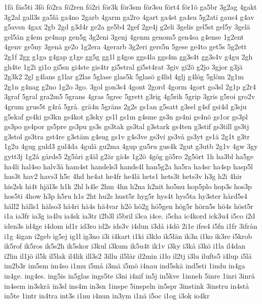 {{1f^^e4
f^^e4s5ti
3f^^f6
f^^f62ra
f^^f62ren
f^^f62ri
f^^f6r3k
f^^f6r3sm
f^^f6r3su
f^^f6rt4
f^^f6r1^^f6
ga5br
3g2ag
4gakt
3g2al
gall3s
ga5l^^e4
ga4no
2garb
4garm
ga2ro
4gart
ga4st
ga4su
5g2ati
gaus4
g4av
g5avsn
4gax
2gb
2gd
g3d4r
ge2a
ge5b4
2gef
2ge4j
g2eli
3gelis
gel5st
gel5y
3gel^^e4
gel5^^e4n
g4em
ge4nap
gen5g
3g2eni
3genj
4genm
genom5
gen4sa
g4ense
1g2ent
4genv
ge5ny
3gen^^e4
ge2o
1g2era
4gerarb
3g2eri
gers5n
5gese
ge4to
get5s
5g2ett
2g1f
2gg
g1ga
g4gap
g1ge
gg5g
gg1l
g4gos
ggs4la
ggs4m
gg3s4t
gg3s4v
g4gu
2gh
gh4te
1g2i
gi1o
gi5sn
gi4ste
gis4tr
gi5stral
gi5st4rat
3giv
gi2^^f6
g2jo
3gjor
g3j^^e4
2g3k2
2gl
g4lans
g1lar
g2las
5glase
glas5k
5glas^^f6
g4lid
4glj
g4l^^f6g
5gl^^f6m
2g1m
2g1n
g4nag
g2no
1g2o
3go.
3gol
gon3s4
4gont
2gord
4gorm
4gort
go3sl
2g1p
g2r4
3graf
5gral
gra2m5
5grans
4gras
5grec
5grett
g3rig
4g5rik
5grip
3gris
g5roi
gro2v
4grum
grus5t
g4r^^e5
5gr^^e5.
gr^^e44n
5gr^^e4ns
2g2s
gs1an
g5satt
g3sel
g4sf
gsi4d
g3sju
g5skaf
gs4ki
gs3kn
gs4kot
g3sky
gs1l
gs1m
g4sme
gs3n
gs4ni
gs4n^^f6
gs1or
gs3pl
gs3po
gs4por
gs5pre
gs3pu
gs3s
gs3tak
gs3tal
g3stark
gs4ten
g3stif
gs3till
gs3tj
g3stol
gs3tra
gst4re
g3st^^e4m
g4sug
gs1v
g4s3ve
gs3vi
gs3v^^e5
gs3yt
gs1^^e4
2g1t
g3tr
1g2u
4gug
guld3
gul4da
4gul^^e4
gu2ma
4gup
gu5ru
gus4k
2gut
g3utb
2g1v
4gw
3gy
gytt3j
1g2^^e5
g^^e5rds5
2g5^^e5ri
g4^^e4l
g2^^e4r
g^^e44s
1g2^^f6
4g^^f6g
g^^f65ro
2g5^^f6rt
1h
ha3bl
ha5ge
ha4li
hal4so
halv3^^e5
ham4st
handels3
hands4l
han5g2a
ha5ra
ha4sc
ha4sp
hasp5l
has3t
hav2
havs3
h5c
4hd
he4at
he4fr
he4l^^e4
hets1
hets3t
hets3v
h3g
h2i
4hir
his2sk
hi4t
hj^^e4l3s
h1k
2hl
h4le
2hm
4hn
h2na
h2nit
ho5nu
hop5plo
hop3s
hos3p
hos5ti
4how
h3p
h5ru
h1s
2ht
hu2s
hust5r
hyg5r
hys4t
hys5ta
hy3ster
h^^e5rd5s4
h^^e4ll2
h^^e4lls1
h^^e4lso3
h^^e44ri
h^^e44s
h^^e44var
h2^^f6
h^^f62g
h^^f65gen
h^^f6g5r
h^^f6rn5s
h^^f64s
h^^f6st5r
i1a
ia3fr
ia3g
ia4lu
ia4sk
ia3tr
i2b3l
i5bril
i3ca
i4ce.
i5cha
ic4kord
ick3u4
i5co
i2d
iden3s
id4ge
i4dom
id1r
id3ro
id2s
ids3v
i4dun
i3d^^e5
i4d^^f6
2i1e
ifes4
i5fn
i1fr
3ifr^^e5n
i1g
4igan
i2geb
ig5ej
ig1l
ig3no
i3i
i4kart
i1ki
i3klo
ik5l^^e4n
ik3n
i1ko
ik3re
i5krob
ik5rof
ik5ros
ik5s2h
ik5skor
i3kul
i3kum
ik5u4t
ik1v
i3ky
i3k^^e5
i3k^^f6
i1la
il4dan
i2lin
il1j^^f6
il5k
il5lak
il4lik
ill3s2
3illu
il5l^^e4r
il2min
i1lo
il2tj
i3lu
ilufts5
i4lup
i5l^^e4
im2b3r
im5sm
im4so
i1mu
i5m^^e5
i3m^^e4
i5m^^f6
i4nau
ind5sk^^e4
ind5sti
1indu
in4ga
in4ge.
ing4es.
ing5is
in5glas
ings5te
i3ni
i4nif
in5j
in5kve
1inneh
5inre
1inri
3inr^^e4
in4sem
in3skr^^e4
in3sl
ins4m
in3sn
1inspe
5inspeln
in5spr
3instink
3instru
in4st^^e5
in5te
1intr
in4tra
int3s
i1nu
i4nun
in3ym
i1n^^e4
i5oc
i1og
i3ok
io4kr
}}
